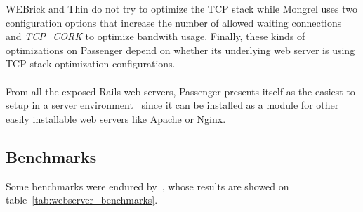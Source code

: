 WEBrick and Thin do not try to optimize the TCP stack while Mongrel uses two configuration options that increase the number of allowed waiting connections and \textit{TCP\_CORK} to optimize bandwith usage. Finally, these kinds of optimizations on Passenger depend on whether its underlying web server is using TCP stack optimization configurations.\\\\%
From all the exposed Rails web servers, Passenger presents itself as the easiest to setup in a server environment~\cite{ruby_webservers} since it can be installed as a module for other easily installable web servers like Apache or Nginx.

\subsection{Benchmarks}
Some benchmarks were endured by~\cite{ruby_webservers}, whose results are showed on table~\ref{tab:webserver_benchmarks}.

